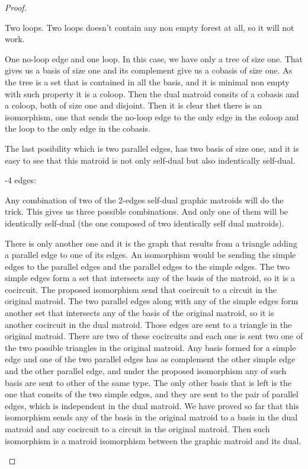 \begin{proof}
\begin{enumerate}[label=(\roman*)]
            Two loops. Two loops doesn't contain any non empty forest at all, so it will not work.\pn
            
            One no-loop edge and one loop. In this case, we have only a tree of size one. That gives us a basis of size one
            and its complement give us a cobasis of size one. As the tree is a set that is contained in all the basis,
            and it is minimal non empty with such property it is a coloop. Then the dual matroid consits of a cobasis and
            a coloop, both of size one and disjoint. Then it is clear thet there is an isomorphism, one that sends the
            no-loop edge to the only edge in the coloop and the loop to the only edge in the cobasis.\pn
            
            The last posibility which is two parallel edges, has two basis of size one, and it is easy to see that this 
            matroid is not only self-dual but also indentically self-dual.\pn
          
            -4 edges:\pn
            
            Any combination of two of the 2-edges self-dual graphic matroids will do the trick. This gives us
            three possible combinations. And only one of them will be identically self-dual (the one composed of two identically
            self dual matroids).
            
            There is only another one and it is the graph that results from a triangle adding a parallel edge to one of its edges.
            An isomorphism would be sending the simple edges to the parallel edges and the parallel edges to the simple edges.
            The two simple edges form a set that intersects any of the basis of the matroid, so it is a cocircuit. 
            The proposed isomorphism send that cocircuit to a circuit in the original matroid. 
            The two parallel edges along with any of the simple edges form another set that intersects any of the basis of the original
            matroid, so it is another cocircuit in the dual matroid. Those edges are sent to a triangle in the original matroid.
            There are two of these cocircuits and each one is sent two one of the two possible triangles in the original matroid.
            Any basis formed for a simple edge and one of the two parallel edges has as complement the other simple edge and the other
            parallel edge, and under the proposed isomorphism any of such basis are sent to other of the same type.
            The only other basis that is left is the one that consits of the two simple edges, and they are sent to the pair of parallel
            edges, which is independent in the dual matroid. We have proved so far that this isomorphism sends any of the 
            basis in the original matroid to a basis in the dual matroid and any cocircuit to  a circuit in the original matroid. Then such isomorphism
            is a matroid isomorphism between the graphic matroid and its dual.\pn
            

\end{enumerate}
\end{proof}
